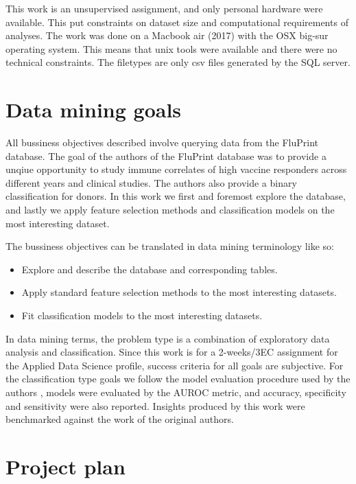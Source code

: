 This work is an unsupervised assignment, and only personal hardware were
available. This put constraints on dataset size and computational requirements
of analyses. The work was done on a Macbook air (2017) with the OSX big-sur
operating system. This means that unix tools were available and there were no
technical constraints. The filetypes are only csv files generated by the SQL
server.

\section{Data mining goals}

All bussiness objectives described involve querying data from the FluPrint
database. The goal of the authors of the FluPrint database was to provide a
unqiue opportunity to study immune correlates of high vaccine responders across
different years and clinical studies. The authors also provide a binary
classification for donors. In this work we first and foremost explore the
database, and lastly we apply feature selection methods and classification
models on the most interesting dataset.

The bussiness objectives can be translated in data mining terminology like so:
\begin{itemize}
        \item Explore and describe the database and corresponding tables.
        \item Apply standard feature selection methods to the most interesting datasets.
        \item Fit classification models to the most interesting datasets.
\end{itemize}

In data mining terms, the problem type is a combination of exploratory data
analysis and classification. Since this work is for a 2-weeks/3EC assignment
for the Applied Data Science profile, success criteria for all goals are
subjective. For the classification type goals we follow
the model evaluation procedure used by the authors
\cite{tomicSIMONAutomatedMachine2019}, models were evaluated by the AUROC
metric, and accuracy, specificity and sensitivity were also reported. Insights
produced by this work were benchmarked against the work of the original
authors.

\section{Project plan}

